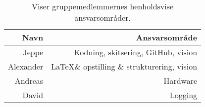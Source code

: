 \begin{table}[H]
    \centering
    \begin{tabular}{r|r}
        \hline
        Navn       & Ansvarsområde              \\ \hline \hline
        Jeppe      & Kodning, skitsering, GitHub, vision                  \\ \hline
        Alexander  & \LaTeX \space\& opstilling \& strukturering, vision \\ \hline
        Andreas    & Hardware                   \\ \hline
        David      & Logging                    \\ \hline
    \end{tabular}
    \caption{Viser gruppemedlemmernes henholdsvise ansvarsområder.}
    \label{sec_2:tab:ansvarsområde}
\end{table}